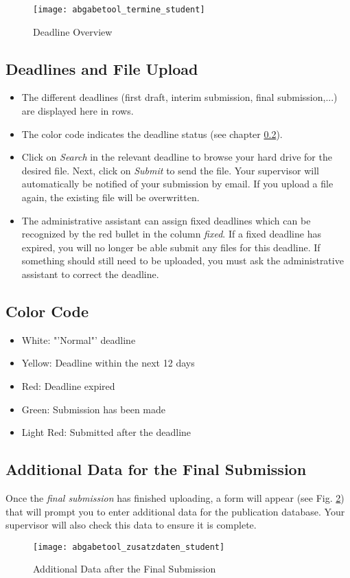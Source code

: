 \begin {figure}
	\centering
	\texttt{[image: abgabetool\_termine\_student]}
	\caption{Deadline Overview}
	\label{abgabetool_termine_student}
\end {figure}

\subsection{Deadlines and File Upload}

\begin{itemize}
	\item The different deadlines (first draft, interim submission, final submission,...) are displayed here in rows. 
	\item The color code indicates the deadline status (see chapter \ref{farbcode}).
	\item Click on \textit{Search} in the relevant deadline to browse your hard drive for the desired file. Next, click on \textit{Submit} to send the file. Your supervisor will automatically be notified of your submission by email. If you upload a file again, the existing file will be overwritten.	
	\item The administrative assistant can assign fixed deadlines which can be recognized by the red bullet in the column \textit{fixed}. If a fixed deadline has expired, you will no longer be able submit any files for this deadline. If something should still need to be uploaded, you must ask the administrative assistant to correct the deadline.
	
\end{itemize}

\subsection{Color Code}
\label{farbcode}

\begin{itemize}
	\item White:	"'Normal"' deadline
	\item Yellow:	Deadline within the next 12 days
	\item Red:	Deadline expired
	\item Green:	Submission has been made
	\item Light Red: Submitted after the deadline 
\end{itemize}

\subsection{Additional Data for the Final Submission}
Once the \textit{final submission} has finished uploading, a form will appear (see Fig. \ref{abgabetool_zusatzdaten_student}) that will prompt you to enter additional data for the publication database. Your supervisor will also check this data to ensure it is complete.

\begin {figure}
	\centering
	\texttt{[image: abgabetool\_zusatzdaten\_student]}
	\caption{Additional Data after the Final Submission}
	\label{abgabetool_zusatzdaten_student}
\end {figure}
